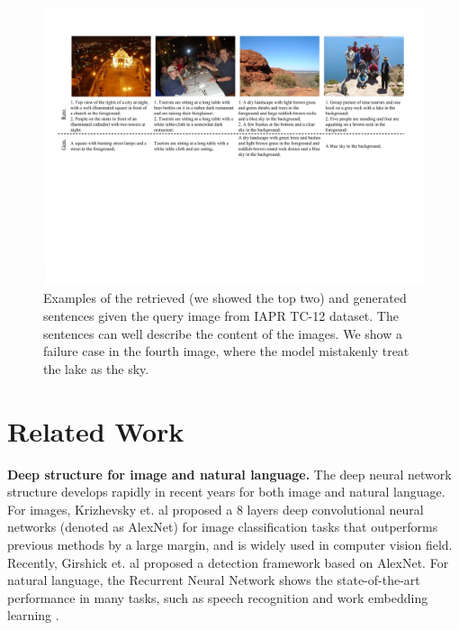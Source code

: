 
\begin{figure}[tb!]
\begin{center}
\includegraphics[width=0.98\linewidth]{PaperFigures/res_example.pdf}
\end{center}
   \caption{Examples of the retrieved (we showed the top two) and generated sentences given the query image from IAPR TC-12 dataset.
   The sentences can well describe the content of the images.
   We show a failure case in the fourth image, where the model mistakenly treat the lake as the sky.
   }
\label{fig:res_example}
\end{figure}

\section{Related Work}
\label{sec:related_work}

\textbf{Deep structure for image and natural language.}
The deep neural network structure develops rapidly in recent years for both image and natural language.
For images, Krizhevsky et. al \cite{krizhevsky2012imagenet} proposed a 8 layers deep convolutional neural networks (denoted as AlexNet) for image classification tasks that outperforms previous methods by a large margin, and is widely used in computer vision field.
Recently, Girshick et. al \cite{girshick2014rcnn} proposed a detection framework based on AlexNet.
For natural language, the Recurrent Neural Network shows the state-of-the-art performance in many tasks, such as speech recognition and work embedding learning \cite{mikolov2010recurrent,mikolov2011extensions,mikolov2013distributed}.

